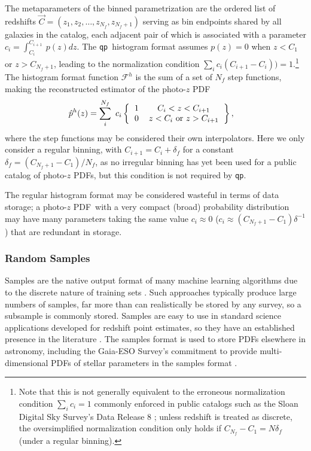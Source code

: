 \documentclass[\docopts]{\docclass}
\newcommand{\qp}{\texttt{qp}}
\newcommand{\pz}{photo-$z$ PDF}
\begin{document}
The metaparameters of the binned parametrization are the ordered list of 
redshifts $\vec{C} = (z_{1}, z_{2}, \dots, z_{N_{f}}, z_{N_{f}+1})$ serving as 
bin endpoints shared by all galaxies in the catalog, each adjacent pair of 
which is associated with a parameter $c_{i}=\int_{C_{i}}^{C_{i+1}}\ p(z)dz$.
The \qp\ histogram format assumes $p(z)=0$ when $z<C_{1}$ or $z>C_{N_{f}+1}$, 
leading to the normalization condition $\sum_{i} c_{i}(C_{i+1}-C_{i})) = 
1$.\footnote{Note that this is not generally equivalent to the erroneous 
normalization condition $\sum_{i} c_{i} = 1$ commonly enforced in public 
catalogs such as the Sloan Digital Sky Survey's Data Release 8 
\citep{sheldon_photometric_2012}; unless redshift is treated as discrete, the 
oversimplified normalization condition only holds if 
$C_{N_{f}}-C_{1}=N\delta_{f}$ (under a regular binning).}
The histogram format function $\mathcal{F}^{h}$ is the sum of a set of $N_{f}$ 
step functions, making the reconstructed estimator of the \pz
\begin{align}
  \label{eq:binned}
  \hat{p}^{h}(z) &= \sum_{i}^{N_{f}}\ c_{i} 
\left\{\begin{tabular}{cc}$1$&$C_{i}<z<C_{i+1}$\\
0&$z < C_{i}$\ or\ $z > C_{i+1}$\end{tabular}\right\},
\end{align}
where the step functions may be considered their own interpolators.
Here we only consider a regular binning, with $C_{i+1}=C_{i}+\delta_{f}$ for a 
constant $\delta_{f}=(C_{N_{f}+1}-C_{1})/N_{f}$, as no irregular binning has 
yet been used for a public catalog of \pz s, but this condition is not required 
by \qp.

The regular histogram format may be considered wasteful in terms of data 
storage; a \pz\ with a very compact (broad) probability distribution may have 
many parameters taking the same value $c_{i}\approx0$ 
($c_{i}\approx(C_{N_{f}+1}-C_{1})\delta^{-1}$) that are redundant in storage.

\subsubsection{Random Samples}
\label{sec:samples}

Samples are the native output format of many machine learning algorithms due to 
the discrete nature of training sets \citep{de_vicente_dnf_2016}.
Such approaches typically produce large numbers of samples, far more than can 
realistically be stored by any survey, so a subsample is commonly stored.
Samples are easy to use in standard science applications developed for redshift 
point estimates, so they have an established presence in the literature 
\citep{bonnett_redshift_2016}.
The samples format is used to store PDFs elsewhere in astronomy, including the 
Gaia-ESO Survey's commitment to provide multi-dimensional PDFs of stellar 
parameters in the samples format \citep{bailer-jones_gaia_2013}.
\end{document}
